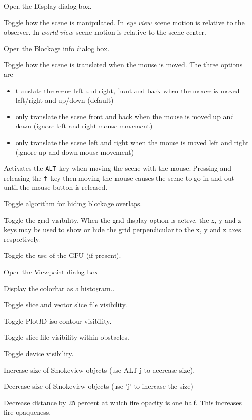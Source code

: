 \documentclass[11pt,twoside]{book}
\newcommand{\kitem}[1]{\item[{\bf {\tt #1 \  }} \hfill]}
\begin{document}
\kitem{ALT d, D}Open the Display dialog box.

\kitem{e}Toggle how the scene is manipulated.  In {\em eye
view}\ scene motion is relative to the observer.  In {\em world
view}\ scene motion is relative to the scene center.

\kitem{ALT e}Open the Blockage info dialog box.

\kitem{E}Toggle how the scene is translated when the mouse is moved.
The three options are
\begin{itemize}
\item translate the scene left and right, front and back when the mouse is moved left/right and up/down (default)
\item only translate the scene front and back when the mouse is moved up and down (ignore left and right mouse movement)
\item only translate the scene left and right when the mouse is moved left and right (ignore up and down mouse movement)
\end{itemize}

\kitem{f}Activates the {\tt ALT}\ key when moving the scene with the mouse.
Pressing and releasing the {\tt f}\ key then moving the mouse causes the scene to go in and out until the
mouse button is released.

\kitem{F}Toggle algorithm for hiding blockage overlaps.

\kitem{g}Toggle the grid visibility.  When the grid display option
is active, the x, y and z keys may be used to show or hide the
grid perpendicular to the x, y and z axes respectively.

\kitem{G}Toggle the use of the GPU (if present).

\kitem{ALT g}Open the Viewpoint dialog box.

\kitem{h}Display the colorbar as a histogram..

\kitem{H}Toggle slice and vector slice file  visibility.

\kitem{i}Toggle Plot3D iso-contour visibility.

\kitem{I}Toggle slice file visibility within obstacles.

\kitem{ALT i}Toggle device visibility.

\kitem{j,J}Increase size of Smokeview objects (use ALT j to decrease size).

\kitem{ALT j}Decrease size of Smokeview objects (use 'j' to increase the size).

\kitem{k}Decrease distance by 25 percent at which fire opacity is one half. This increases fire opaqueness.
\end{document}
